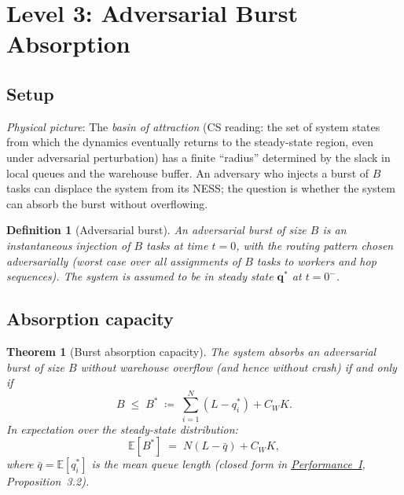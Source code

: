\documentclass[11pt,a4paper]{article}
\newtheorem{theorem}{Theorem}[section]
\newtheorem{definition}{Definition}[section]
\newcommand{\qbar}{\bar{q}}
\begin{document}
\section{Level 3: Adversarial Burst Absorption}

\subsection{Setup}

\emph{Physical picture}:
The \emph{basin of attraction}
(CS reading: the set of system states from which the dynamics eventually
returns to the steady-state region, even under adversarial perturbation)
has a finite ``radius'' determined by the slack in local queues and the
warehouse buffer.
An adversary who injects a burst of $B$ tasks can displace the system
from its NESS; the question is whether the system can absorb the burst
without overflowing.

\begin{definition}[Adversarial burst]
An \emph{adversarial burst} of size $B$ is an instantaneous injection
of $B$ tasks at time $t = 0$, with the routing pattern chosen adversarially
(worst case over all assignments of $B$ tasks to workers and hop sequences).
The system is assumed to be in steady state $\mathbf{q}^*$ at $t = 0^-$.
\end{definition}

\subsection{Absorption capacity}

\begin{theorem}[Burst absorption capacity]
\label{thm:burst}
The system absorbs an adversarial burst of size $B$ without warehouse
overflow (and hence without crash) if and only if
\begin{equation}
  B \;\leq\; B^* \;\coloneqq\; \sum_{i=1}^N (L - q_i^*) + C_W K.
  \label{eq:burst-capacity}
\end{equation}
In expectation over the steady-state distribution:
\begin{equation}
  \mathbb{E}[B^*] \;=\; N(L - \qbar) + C_W K,
  \label{eq:burst-expect}
\end{equation}
where $\qbar = \mathbb{E}[q_i^*]$ is the mean queue length
(closed form in \hyperref[chap:load_balance]{Performance~I}, Proposition~3.2).
\end{theorem}
\end{document}
